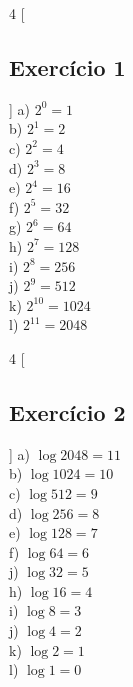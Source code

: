 \documentclass[12pt]{article}
\begin{document}
\begin{multicols}{4}
  [
    \subsection{Exercício 1}
  ]
  a) $2^{0} = 1$ \\
  b) $2^{1} = 2$ \\
  c) $2^{2} = 4$ \\
  d) $2^{3} = 8$ \\
  e) $2^{4} = 16$ \\
  f) $2^{5} = 32$ \\
  g) $2^{6} = 64$ \\
  h) $2^{7} = 128$ \\
  i) $2^{8} = 256$ \\
  j) $2^{9} = 512$ \\
  k) $2^{10} = 1024$ \\
  l) $2^{11} = 2048$ \\
  \end{multicols}


\begin{multicols}{4}
  [
    \subsection{Exercício 2}
  ]
  a) $\log{2048} = 11$ \\
  b) $\log{1024} = 10$ \\
  c) $\log{512} = 9$ \\
  d) $\log{256} = 8$ \\
  e) $\log{128} = 7$ \\
  f) $\log{64} = 6$ \\
  j) $\log{32} = 5$ \\
  h) $\log{16} = 4$ \\
  i) $\log{8} = 3$ \\
  j) $\log{4} = 2$ \\
  k) $\log{2} = 1$ \\
  l) $\log{1} = 0$ \\
\end{multicols}
\end{document}
